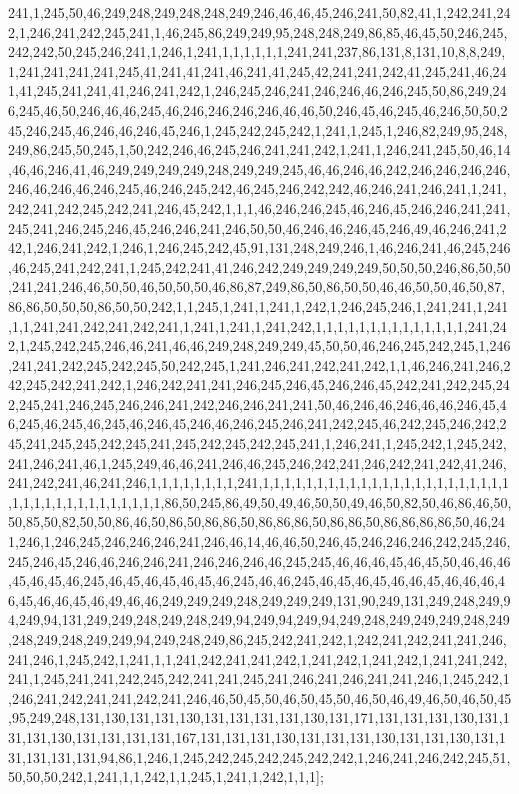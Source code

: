 241,1,245,50,46,249,248,249,248,248,249,246,46,46,45,246,241,50,82,41,1,242,241,242,1,246,241,242,245,241,1,46,245,86,249,249,95,248,248,249,86,85,46,45,50,246,245,242,242,50,245,246,241,1,246,1,241,1,1,1,1,1,1,241,241,237,86,131,8,131,10,8,8,249,1,241,241,241,241,245,41,241,41,241,46,241,41,245,42,241,241,242,41,245,241,46,241,41,245,241,241,41,246,241,242,1,246,245,246,241,246,246,46,246,245,50,86,249,246,245,46,50,246,46,46,245,46,246,246,246,246,46,46,50,246,45,46,245,46,246,50,50,245,246,245,46,246,46,246,45,246,1,245,242,245,242,1,241,1,245,1,246,82,249,95,248,249,86,245,50,245,1,50,242,246,46,245,246,241,241,242,1,241,1,246,241,245,50,46,14,46,46,246,41,46,249,249,249,249,248,249,249,245,46,46,246,46,242,246,246,246,246,246,46,246,46,246,245,46,246,245,242,46,245,246,242,242,46,246,241,246,241,1,241,242,241,242,245,242,241,246,45,242,1,1,1,46,246,246,245,46,246,45,246,246,241,241,245,241,246,245,246,45,246,246,241,246,50,50,46,246,46,246,45,246,49,46,246,241,242,1,246,241,242,1,246,1,246,245,242,45,91,131,248,249,246,1,46,246,241,46,245,246,46,245,241,242,241,1,245,242,241,41,246,242,249,249,249,249,50,50,50,246,86,50,50,241,241,246,46,50,50,46,50,50,50,46,86,87,249,86,50,86,50,50,46,46,50,50,46,50,87,86,86,50,50,50,86,50,50,242,1,1,245,1,241,1,241,1,242,1,246,245,246,1,241,241,1,241,1,1,241,241,242,241,242,241,1,241,1,241,1,241,242,1,1,1,1,1,1,1,1,1,1,1,1,1,1,241,242,1,245,242,245,246,46,241,46,46,249,248,249,249,45,50,50,46,246,245,242,245,1,246,241,241,242,245,242,245,50,242,245,1,241,246,241,242,241,242,1,1,46,246,241,246,242,245,242,241,242,1,246,242,241,241,246,245,246,45,246,246,45,242,241,242,245,242,245,241,246,245,246,246,241,242,246,246,241,241,50,46,246,46,246,46,46,246,45,46,245,46,245,46,245,46,246,45,246,46,246,245,246,241,242,245,46,242,245,246,242,245,241,245,245,242,245,241,245,242,245,242,245,241,1,246,241,1,245,242,1,245,242,241,246,241,46,1,245,249,46,46,241,246,46,245,246,242,241,246,242,241,242,41,246,241,242,241,46,241,246,1,1,1,1,1,1,1,1,241,1,1,1,1,1,1,1,1,1,1,1,1,1,1,1,1,1,1,1,1,1,1,1,1,1,1,1,1,1,1,1,1,1,1,1,1,1,86,50,245,86,49,50,49,46,50,50,49,46,50,82,50,46,86,46,50,50,85,50,82,50,50,86,46,50,86,50,86,86,50,86,86,86,50,86,86,50,86,86,86,86,50,46,241,246,1,246,245,246,246,246,241,246,46,14,46,46,50,246,45,246,246,246,242,245,246,245,246,45,246,46,246,246,241,246,246,246,46,245,245,46,46,46,45,46,45,50,46,46,46,45,46,45,46,245,46,45,46,45,46,45,46,245,46,46,245,46,45,46,45,46,46,45,46,46,46,46,45,46,46,45,46,49,46,46,249,249,249,248,249,249,249,131,90,249,131,249,248,249,94,249,94,131,249,249,248,249,248,249,94,249,94,249,94,249,248,249,249,249,248,249,248,249,248,249,249,94,249,248,249,86,245,242,241,242,1,242,241,242,241,241,246,241,246,1,245,242,1,241,1,1,241,242,241,241,242,1,241,242,1,241,242,1,241,241,242,241,1,245,241,241,242,245,242,241,241,245,241,246,241,246,241,241,246,1,245,242,1,246,241,242,241,241,242,241,246,46,50,45,50,46,50,45,50,46,50,46,49,46,50,46,50,45,95,249,248,131,130,131,131,130,131,131,131,131,130,131,171,131,131,131,130,131,131,131,130,131,131,131,131,167,131,131,131,130,131,131,131,130,131,131,130,131,131,131,131,131,94,86,1,246,1,245,242,245,242,245,242,242,1,246,241,246,242,245,51,50,50,50,242,1,241,1,1,242,1,1,245,1,241,1,242,1,1,1];

